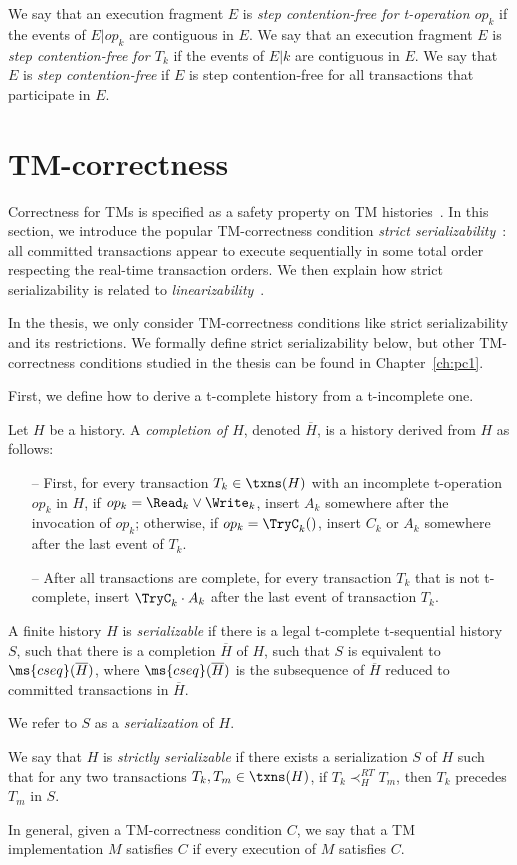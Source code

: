 We say that an execution fragment $E$ is \emph{step contention-free for t-operation $op_k$} if the events of $E|op_k$ 
are contiguous in $E$.
We say that an execution fragment $E$ is \emph{step contention-free for $T_k$} if the events of $E|k$ are contiguous in $E$.
We say that $E$ is \emph{step contention-free} if $E$ is step contention-free for all transactions that participate in $E$.
\section{TM-correctness}
\label{sec:tm-correctness}
Correctness for TMs is specified as a safety property on TM histories~\cite{OL82,AS85,Lyn96}.
In this section, we introduce the popular TM-correctness condition \emph{strict serializability}~\cite{Pap79-serial}:
all committed transactions appear to execute sequentially in some total order respecting the real-time transaction orders.
We then explain how strict serializability is related to \emph{linearizability}~\cite{HW90}.

In the thesis, we only consider TM-correctness conditions like strict serializability and its restrictions.
We formally define strict serializability below, but other TM-correctness conditions studied in the
thesis can be found in Chapter~\ref{ch:pc1}.

First, we define how to derive a t-complete history from a t-incomplete one.
\begin{definition}[Completions]
\label{def:comp}
Let $H$ be a history.
A \emph{completion of $H$}, denoted ${\overline{H}}$,
is a history derived from $H$ as follows:
\begin{itemize}
\item[--]
First, for every transaction $T_k \in \txns(H)$
with an incomplete t-operation $op_k$ in $H$,
if $op_k=\Read_k \vee \Write_k$,
insert $A_k$ somewhere after the invocation of $op_k$;
otherwise, if $op_k=\TryC_k()$,
insert $C_k$ or $A_k$ somewhere after the last event of $T_k$.
\item[--]
After all transactions are complete,
for every transaction $T_k$ that is not t-complete,
insert $\TryC_k\cdot A_k$ after the last event of transaction $T_k$.
\end{itemize}
\end{definition}
\begin{definition}
\label{def:oser}
A finite history $H$ is \emph{serializable} if there
is a legal t-complete t-sequential history $S$,
such that
there is a completion $\overline{H}$ of $H$,
such that $S$ is equivalent to $\ms{cseq}(\overline{H})$,
where $\ms{cseq}(\overline{H})$ is the subsequence of $\overline{H}$
reduced to committed transactions in $\overline{H}$.


We refer to $S$ as a \emph{serialization} of $H$.

We say that $H$ is \emph{strictly serializable} if there exists a serialization $S$ of $H$ such that
for any two transactions $T_k,T_m \in \txns(H)$,
if $T_k \prec_H^{RT} T_m$, then $T_k$ precedes $T_m$ in $S$.
\end{definition}
In general, given a TM-correctness condition $C$, we say that a TM implementation $M$ satisfies $C$ if every
execution of $M$ satisfies $C$.

